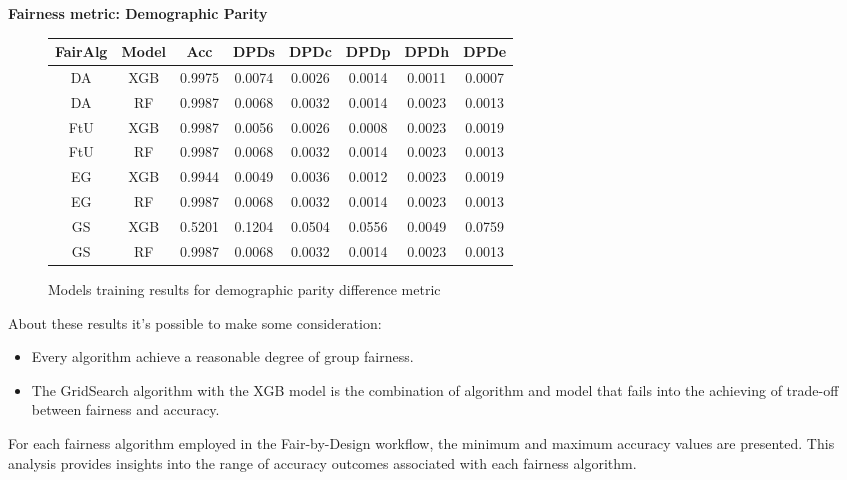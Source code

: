 \newpage
\textbf{Fairness metric: Demographic Parity}

\begin{figure}[H]
    \centering
    \begin{tabular}{|c|c|c|c|c|c|c|c|}
        \hline
        \textbf{FairAlg} & \textbf{Model} & \textbf{Acc} & \textbf{DPDs} & \textbf{DPDc} & \textbf{DPDp} & \textbf{DPDh} & \textbf{DPDe} \\
        \hline
        DA & XGB & 0.9975 & 0.0074 & 0.0026 & 0.0014 & 0.0011 & 0.0007\\
        \hline
        DA & RF & 0.9987 & 0.0068 & 0.0032 & 0.0014 & 0.0023 & 0.0013\\
        \hline
        FtU & XGB & 0.9987 & 0.0056 & 0.0026 & 0.0008 & 0.0023 & 0.0019 \\
        \hline
        FtU & RF & 0.9987 & 0.0068 & 0.0032 & 0.0014 & 0.0023 & 0.0013 \\
        \hline
        EG & XGB & 0.9944 & 0.0049 & 0.0036 & 0.0012 & 0.0023 & 0.0019 \\
        \hline
        EG & RF & 0.9987 & 0.0068 & 0.0032 & 0.0014 & 0.0023 & 0.0013 \\
        \hline
        GS & XGB & 0.5201 & 0.1204 & 0.0504 & 0.0556 & 0.0049 & 0.0759 \\
        \hline
        GS & RF & 0.9987 & 0.0068 & 0.0032 & 0.0014 & 0.0023 & 0.0013 \\
        \hline
    \end{tabular}
    \caption{Models training results for demographic parity difference metric}
    \label{fig:results}
\end{figure}

About these results it's possible to make some consideration:

\begin{itemize}
        \item Every algorithm achieve a reasonable degree of group fairness.

        \item The GridSearch algorithm with the XGB model is the combination of algorithm and model that fails into the achieving of trade-off between fairness and accuracy.

\end{itemize}

\newpage
For each fairness algorithm employed in the Fair-by-Design workflow, the minimum and maximum accuracy values are presented. This analysis provides insights into the range of accuracy outcomes associated with each fairness algorithm.

